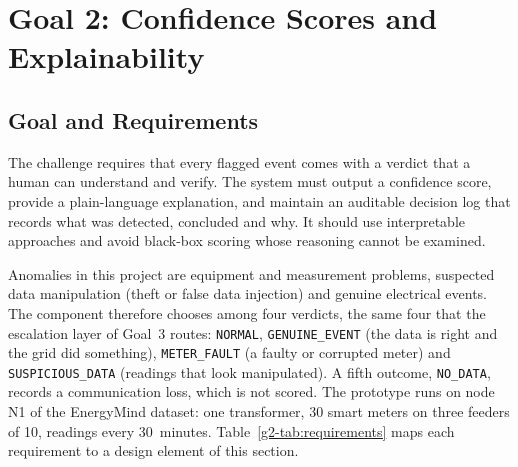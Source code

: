 \providecommand{\GE}{\texttt{GENUINE\_EVENT}}
\providecommand{\MF}{\texttt{METER\_FAULT}}
\providecommand{\SD}{\texttt{SUSPICIOUS\_DATA}}
\providecommand{\ND}{\texttt{NO\_DATA}}
\providecommand{\NORM}{\texttt{NORMAL}}

\section{Goal 2: Confidence Scores and Explainability}
\label{g2-sec:goal2}

\subsection{Goal and Requirements}
The challenge requires that every flagged event comes with a verdict that a human can understand and
verify. The system must output a confidence score, provide a plain-language explanation, and maintain an
auditable decision log that records what was detected, concluded and why. It should use interpretable
approaches and avoid black-box scoring whose reasoning cannot be examined.

Anomalies in this project are equipment and measurement problems, suspected data manipulation (theft or
false data injection) and genuine electrical events. The component therefore chooses among four verdicts,
the same four that the escalation layer of Goal~3 routes: \NORM, \GE{} (the data is right and the grid did
something), \MF{} (a faulty or corrupted meter) and \SD{} (readings that look manipulated). A fifth outcome,
\ND, records a communication loss, which is not scored. The prototype runs on node N1 of the EnergyMind
dataset: one transformer, 30 smart meters on three feeders of 10, readings every 30~minutes.
Table~\ref{g2-tab:requirements} maps each requirement to a design element of this section.

